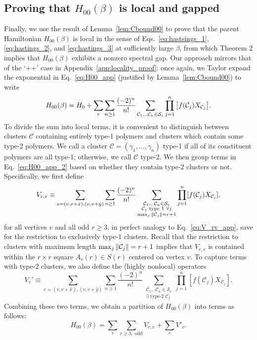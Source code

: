 \subsection{Proving that \texorpdfstring{$H_{00}(\beta)$}{H00beta} is local and gapped}
\label{subsec:H00_locality}
Finally, we use the result of Lemma~\ref{lem:Cbound00} to prove that the parent Hamiltonian $H_{00}(\beta)$ is local in the sense of Eqs.~\eqref{eq:hastsings_1}, \eqref{eq:hastings_2}, and \eqref{eq:hastings_3}  at sufficiently large $\beta$, from which Theorem 2 implies that $H_{00}(\beta)$ exhibits a nonzero spectral gap. Our approach mirrors that of the `++' case in Appendix~\ref{app:locality_proof}: once again, we Taylor expand the exponential in Eq.~\eqref{eq:H00_app} (justified by Lemma~\ref{lem:Cbound00}) to write
\begin{equation}
\label{eq:H00_app_2}
    H_{00}(\beta) = H_0 + \sum_e \sum_{n \geq 1} \frac{(-2)^n}{n!} \sum_{\mathcal{C}_1 \ldots \mathcal{C}_n \in \mathcal{S}_e} \prod_{j = 1}^n \qty[ f(\mathcal{C}_j) X_{\mathcal{C}_j} ] .
\end{equation}
To divide the sum into local terms, it is convenient to distinguish between clusters $\mathcal{C}$ containing entirely type-1 polymers and clusters which contain some type-2 polymers. We call a cluster $\mathcal{C} = (\gamma_1, \ldots , \gamma_n)$ type-1 if all of its constituent polymers are all type-1; otherwise, we call $\mathcal{C}$ type-2. We then group terms in Eq.~\eqref{eq:H00_app_2} based on whether they contain type-2 clusters or not. Specifically, we first define
\begin{equation}
    V_{r, v} \equiv \sum_{e = (v, v + \hat{x}), (v, v + \hat{y})} \sum_{n \geq 1} \frac{(-2)^n}{n!} \sum_{\substack{\mathcal{C}_1 \ldots \mathcal{C}_n \in \mathcal{S}_e \\ \mathcal{C}_j \text{ type 1 } \forall j \\ \max_j \norm{\mathcal{C}_j} = r + 1}} \prod_{j = 1}^n [f(\mathcal{C}_j) X_{\mathcal{C}_j}] ,
\end{equation}
for all vertices $v$ and all odd $r \geq 3$, in perfect analogy to Eq.~\eqref{eq:V_rv_app}, save for the restriction to exclusively type-1 clusters. Recall that the restriction to clusters with maximum length $\max_j \norm{\mathcal{C}_j} = r+1$ implies that $V_{r,v}$ is contained within the $r \times r$ square $A_v(r) \in S(r)$ centered on vertex $v$. To capture terms with type-2 clusters, we also define the (highly nonlocal) operators
\begin{equation}
    V_v' \equiv \sum_{e = (v, v + \hat{x}), (v, v + \hat{y})} \sum_{n \geq 1} \frac{(-2)^n}{n!} \sum_{\substack{\mathcal{C}_1 \ldots \mathcal{C}_n \in \mathcal{S}_e \\ \exists \text{ type-2 } \mathcal{C}_j}} \prod_{j = 1}^n [f(\mathcal{C}_j) X_{\mathcal{C}_j}] .
\end{equation}
Combining these two terms, we obtain a partition of $H_{00}(\beta)$ into terms as follows:
\begin{equation}
    H_{00}(\beta) = \sum_{v} \sum_{r \geq 3, \text{ odd}} V_{r, v} + \sum_v V'_v .
\end{equation}

